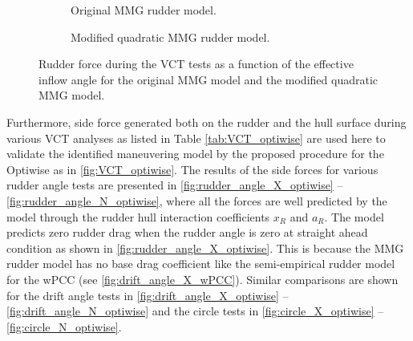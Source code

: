\begin{figure}[h]
     \centering
     \begin{subfigure}[b]{0.49\textwidth}
         \centering
         
        \caption{Original MMG rudder model.}
        \label{fig:Y_R_MMG_original}
     \end{subfigure}
     \hfill
     \begin{subfigure}[b]{0.49\textwidth}
         \centering
         
        \caption{Modified quadratic MMG rudder model.}
        \label{fig:Y_R_MMG_quadratic}
     \end{subfigure}
    \caption{Rudder force during the VCT tests as a function of the effective inflow angle for the original MMG model and the modified quadratic MMG model.}
    \label{fig:MMG_quadratic}
\end{figure}

Furthermore, side force generated both on the rudder and the hull surface during various VCT analyses as listed in Table \ref{tab:VCT_optiwise} are used here to validate the identified maneuvering model by the proposed procedure for the Optiwise as in \autoref{fig:VCT_optiwise}. The results of the side forces for various rudder angle tests are presented in \autoref{fig:rudder_angle_X_optiwise} -- \autoref{fig:rudder_angle_N_optiwise}, where all the forces are well predicted by the model through the rudder hull interaction coefficients $x_R$ and $a_R$. 
The model predicts zero rudder drag when the rudder angle is zero at straight ahead condition as shown in \autoref{fig:rudder_angle_X_optiwise}. This is because the MMG rudder model has no base drag coefficient like the semi-empirical rudder model for the wPCC (see \autoref{fig:drift_angle_X_wPCC}).
Similar comparisons are shown for the drift angle tests in \autoref{fig:drift_angle_X_optiwise} -- \autoref{fig:drift_angle_N_optiwise} and the circle tests in \autoref{fig:circle_X_optiwise} -- \autoref{fig:circle_N_optiwise}. 


